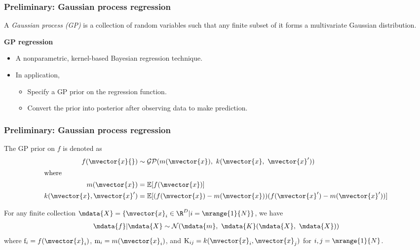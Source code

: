 \begin{frame}[t]
    \frametitle{Preliminary: Gaussian process regression}
    A \emph{Gaussian process (GP)} is a collection of random variables such that any finite subset of it forms a multivariate Gaussian distribution.
    
    \vspace{\baselineskip}
    \textbf{GP regression}
    \begin{itemize}
        \item A nonparametric, kernel-based Bayesian regression technique.
        \item In application, 
        \begin{itemize}
            \item Specify a GP prior on the regression function.
            \item Convert the prior into posterior after observing data to make prediction.
        \end{itemize}
    \end{itemize}
\end{frame}

\begin{frame}[t]
    \frametitle{Preliminary: Gaussian process regression}    
    The GP prior on $f$ is denoted as
    \begin{align}
        f(\mvector{x}{}) & \sim \mathcal{GP}(m(\mvector{x}),\ k(\mvector{x},\ \mvector{x}^\prime)) 
        \label{eq-gp}
        \\
        \intertext{where}
        m(\mvector{x}) &= \mathbb{E}[f(\mvector{x})]
        \nonumber
        \\  		
        k(\mvector{x}, \mvector{x}^\prime) &= \mathbb{E}[(f(\mvector{x}) - m(\mvector{x}))(f(\mvector{x}^\prime) - m(\mvector{x}^\prime))]
        \nonumber
    \end{align}    
    
    \vspace{\baselineskip}
    For any finite collection $\mdata{X} = \{\mvector{x}_i \in \R^D \vert i=\mrange{1}{N}\}$, we have
    \begin{align}
        \mdata{f} \vert \mdata{X} \sim \mathcal{N}(\mdata{m},\ \mdata{K}(\mdata{X},\ \mdata{X}))        
    \end{align}
    where $\mathrm{f}_i = f(\mvector{x}_i)$, $\mathrm{m}_i = m(\mvector{x}_i)$, and $\mathrm{K}_{ij} = k(\mvector{x}_i, \mvector{x}_j)$ for $i, j=\mrange{1}{N}$.
\end{frame}


